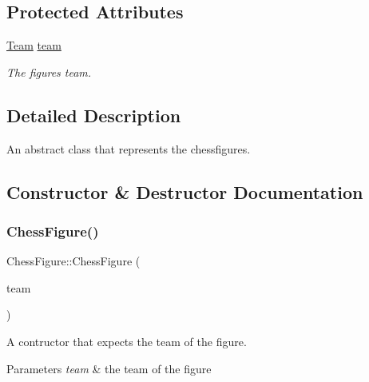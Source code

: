 \subsection*{Protected Attributes}
\begin{DoxyCompactItemize}
\item 
\mbox{\label{classChessFigure_ac7d0751a28c94d49927b9524390d1261}} 
\mbox{\hyperlink{classChessFigure_a62f54318c1f28a08e6a6a2707f697a1d}{Team}} \mbox{\hyperlink{classChessFigure_ac7d0751a28c94d49927b9524390d1261}{team}}
\begin{DoxyCompactList}\small\item\em The figure\textquotesingle{}s team. \end{DoxyCompactList}\end{DoxyCompactItemize}


\subsection{Detailed Description}
An abstract class that represents the chessfigures. 

\subsection{Constructor \& Destructor Documentation}
\mbox{\label{classChessFigure_a09347f3c6276fc99ec111e44d2095c88}} 
\subsubsection{\texorpdfstring{Chess\+Figure()}{ChessFigure()}}
{\footnotesize\ttfamily Chess\+Figure\+::\+Chess\+Figure (\begin{DoxyParamCaption}\item[{\mbox{\hyperlink{classChessFigure_a62f54318c1f28a08e6a6a2707f697a1d}{Team}}}]{team }\end{DoxyParamCaption})}



A contructor that expects the team of the figure. 


\begin{DoxyParams}{Parameters}
{\em team} & the team of the figure \\
\hline
\end{DoxyParams}



